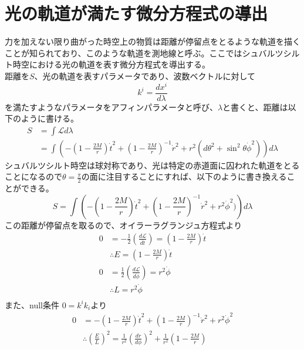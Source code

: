 \documentclass[dvipdfmx]{report} %
\begin{document}
\section{光の軌道が満たす微分方程式の導出}
力を加えない限り曲がった時空上の物質は距離が停留点をとるような軌道を描くことが知られており、このような軌道を測地線と呼ぶ。ここではシュバルツシルト時空における光の軌道を表す微分方程式を導出する。\\
距離を$S$、光の軌道を表すパラメータであり、波数ベクトルに対して
\[
	k^i = \frac{d x^i}{d \lambda}
\]
を満たすようなパラメータをアフィンパラメータと呼び、$\lambda$と書くと、距離は以下のように書ける。
\begin{equation*}
\begin{split}
	S &= \int \mathcal{L} d\lambda \\
	&= \int \left(
		-\left( 1 - \frac{2M}{r} \right)\dot{t}^2
		+ \left( 1 - \frac{2M}{r} \right)^{-1}\dot{r}^2
		+ r^2( d\theta^2 + \sin^2\theta \dot{\phi}^2 )
	\right) d\lambda
\end{split}
\end{equation*}
シュバルツシルト時空は球対称であり、光は特定の赤道面に囚われた軌道をとることになるので$\theta = \frac{\pi}{2}$の面に注目することにすれば、以下のように書き換えることができる。
\[
S = 	\int \left(
		-\left( 1 - \frac{2M}{r} \right)\dot{t}^2
		+ \left( 1 - \frac{2M}{r} \right)^{-1}\dot{r}^2
		+ r^2\dot{\phi}^2 )
	\right) d\lambda
\]
この距離が停留点を取るので、オイラーラグランジュ方程式より
\begin{equation*}
\begin{split}
	0 &
		= - \frac{1}{2}\left( \frac{d\mathcal{L}}{d\dot{t}} \right)
		= \left( 1 - \frac{2M}{r} \right) \dot{t}\\
	&\therefore  E = \left( 1 - \frac{2M}{r} \right) \dot{t}\\
	0 &
		= \frac{1}{2}\left( \frac{d\mathcal{L}}{d\dot{\phi}} \right)
		= r^2 \dot{\phi}\\
	&\therefore  L = r^2  \dot{\phi}\\
\end{split}
\end{equation*}
また、null条件 $0=k^ik_i$より
\begin{equation*}
\begin{split}
	0 &= -\left( 1 - \frac{2M}{r} \right)\dot{t}^2
		+ \left( 1 - \frac{2M}{r} \right)^{-1}\dot{r}^2
		+ r^2\dot{\phi}^2\\
	&\therefore
		\left( \frac{E}{L} \right)^2 =
			\frac{1}{r^2} \left( \frac{dr}{d\phi} \right)^2
			+ \frac{1}{r^2} \left( 1 - \frac{2M}{r} \right)
\end{split}
\end{equation*}
\end{document}
